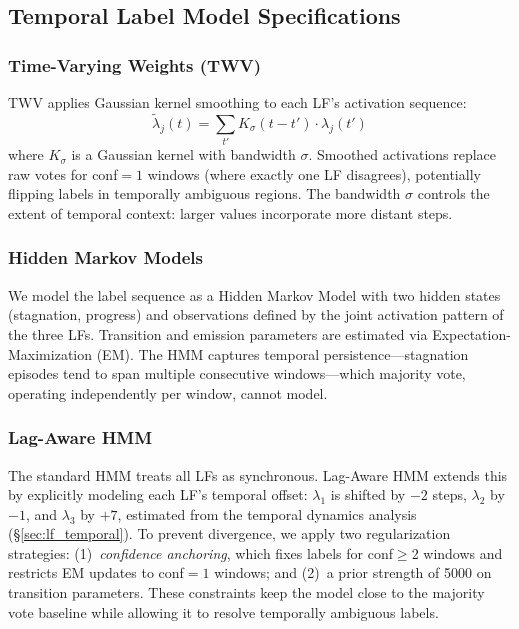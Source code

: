 \subsection{Temporal Label Model Specifications}
\label{sec:app_temporal_models}

\subsubsection{Time-Varying Weights (TWV)}

TWV applies Gaussian kernel smoothing to each LF's activation sequence:
\begin{equation}
\tilde{\lambda}_j(t) = \sum_{t'} K_\sigma(t - t') \cdot \lambda_j(t')
\label{eq:twv}
\end{equation}
where $K_\sigma$ is a Gaussian kernel with bandwidth $\sigma$.
Smoothed activations replace raw votes for conf${=}1$ windows (where exactly one LF disagrees), potentially flipping labels in temporally ambiguous regions.
The bandwidth $\sigma$ controls the extent of temporal context: larger values incorporate more distant steps.

\subsubsection{Hidden Markov Models}

We model the label sequence as a Hidden Markov Model \citep{safranchik2020linkedhmm} with two hidden states (stagnation, progress) and observations defined by the joint activation pattern of the three LFs.
Transition and emission parameters are estimated via Expectation-Maximization (EM).
The HMM captures temporal persistence---stagnation episodes tend to span multiple consecutive windows---which majority vote, operating independently per window, cannot model.

\subsubsection{Lag-Aware HMM}

The standard HMM treats all LFs as synchronous.
Lag-Aware HMM extends this by explicitly modeling each LF's temporal offset: $\lambda_1$ is shifted by $-2$ steps, $\lambda_2$ by $-1$, and $\lambda_3$ by $+7$, estimated from the temporal dynamics analysis (\S\ref{sec:lf_temporal}).
To prevent divergence, we apply two regularization strategies: (1)~\emph{confidence anchoring}, which fixes labels for conf${\geq}$2 windows and restricts EM updates to conf${=}1$ windows; and (2)~a prior strength of 5000 on transition parameters.
These constraints keep the model close to the majority vote baseline while allowing it to resolve temporally ambiguous labels.

